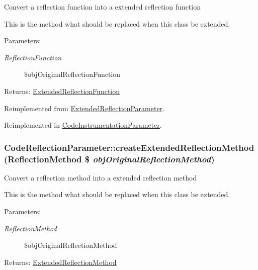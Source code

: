 Convert a reflection function into a extended reflection function

This is the method what should be replaced when this class be extended.

\begin{Desc}
\item[Parameters:]
\begin{description}
\item[{\em ReflectionFunction}]\$objOriginalReflectionFunction \end{description}
\end{Desc}
\begin{Desc}
\item[Returns:]\hyperlink{class_extended_reflection_function}{ExtendedReflectionFunction} \end{Desc}


Reimplemented from \hyperlink{class_extended_reflection_parameter_8bea4c5548f8e5476b28c37b705dc25e}{ExtendedReflectionParameter}.

Reimplemented in \hyperlink{class_code_instrumentation_parameter_e9723a389b48bdb31fc49f784692aecf}{CodeInstrumentationParameter}.\hypertarget{class_code_reflection_parameter_04d7dbd71bc943f3e267869a79bec648}{
\subsubsection[{createExtendedReflectionMethod}]{\setlength{\rightskip}{0pt plus 5cm}CodeReflectionParameter::createExtendedReflectionMethod (ReflectionMethod \$ {\em objOriginalReflectionMethod})}}
\label{class_code_reflection_parameter_04d7dbd71bc943f3e267869a79bec648}


Convert a reflection method into a extended reflection method

This is the method what should be replaced when this class be extended.

\begin{Desc}
\item[Parameters:]
\begin{description}
\item[{\em ReflectionMethod}]\$objOriginalReflectionMethod \end{description}
\end{Desc}
\begin{Desc}
\item[Returns:]\hyperlink{class_extended_reflection_method}{ExtendedReflectionMethod} \end{Desc}


